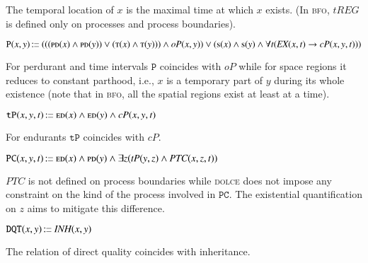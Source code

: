 \documentclass[ao]{iosart2x}
\newcommand{\nb}[1]{\textcolor{red}{$|$}\marginpar{\hspace*{-0cm}\parbox{20mm}{\scriptsize\raggedright\textcolor{red}{#1}}}}
\newcommand{\bfoAxLabel}{\textrm{a$_\texttt{b}$}}
\newcommand{\bdDefLabel}{\textrm{d$_\texttt{bd}$}}
\newcounter{cntbddf}
\newcommand{\bddf}[1]{\refstepcounter{cntbddf}\begin{small}{\bf \bdDefLabel\thecntbddf\label{#1}}\end{small}}
\newcommand{\refbfoax}[1]{({\bfoAxLabel}\ref{#1})}
\newcommand{\refbddf}[1]{({\bdDefLabel}\ref{#1})}
\newcommand{\pr}[1]{\mathtt{#1}}
\newcommand{\prbfo}[1]{{\textit{{#1}}}}
\newcommand\textequal{%
 \rule[.08ex]{5pt}{0.35pt}\llap{\rule[.78ex]{5pt}{0.35pt}}}
\newcommand{\sdef}{{\hspace{1.5pt}:\hspace{-2.5pt}\textequal\hspace{3pt}}}
\newcommand{\dolce}{{\textsc{dolce}}}
\newcommand{\bfo}{{\textsc{bfo}}}
\newcommand {\EDdcat} {\textsc{ed}}
\newcommand {\PDdcat} {\textsc{pd}}
\newcommand {\PRdcat} {\textsc{pr}}
\newcommand {\Sdcat} {\textsc{s}}
\newcommand {\Tdcat} {\textsc{t}}
\newcommand {\TPd} {\ensuremath{\pr{tP}}}
\newcommand {\Pd} {\ensuremath{\pr{P}}}
\newcommand {\DQTd} {\ensuremath{\pr{DQT}}}
\newcommand {\PCd} {\ensuremath{\pr{PC}}}
\newcommand{\bfoisa}{\prbfo{ISA}}
\newcommand{\bfocpart}{\prbfo{cP}}
\newcommand{\bfoopart}{\prbfo{oP}}
\newcommand{\bfotpart}{\prbfo{tP}}
\newcommand{\bfoexist}{\prbfo{EX}}
\newcommand{\bfoinh}{\prbfo{INH}}
\newcommand{\bfotregof}{\prbfo{tREG}}
\newcommand{\bfoparticin}{\prbfo{PTC}}
\begin{document}
\vspace{1pt}
The temporal location of $x$ is the maximal time at which $x$ exists. (In {\bfo}, $\bfotregof$ is defined only on processes and process boundaries). 


\item[\bddf{b2d_Pd}] $\Pd(x,y)\sdef (((\PDdcat(x) \land \PDdcat(y)) \lor (\Tdcat(x) \land \Tdcat(y))) \land \bfoopart(x,y)) \lor (\Sdcat(x) \land \Sdcat(y) \land \forall t(\bfoexist(x,t) \to \bfocpart(x,y,t)))$

\vspace{1pt}
For perdurant and time intervals $\Pd$ coincides with $\bfoopart$ while for space regions it reduces to constant parthood, i.e., $x$ is a temporary part of $y$ during its whole existence (note that in {\bfo}, all the spatial regions exist at least at a time). 

%
%

\item[\bddf{b2d_TPd}] $\TPd(x,y,t) \sdef \EDdcat(x) \land \EDdcat(y) \land \bfocpart(x,y,t)$

\vspace{1pt}
For endurants $\TPd$ coincides with $\bfocpart$. 

\item[\bddf{b2d_PCd}] $\PCd(x,y,t) \sdef \EDdcat(x) \land \PDdcat(y) \land \exists z(\bfotpart(y,z) \land \bfoparticin(x,z,t))$

\vspace{1pt}
$\bfoparticin$ is not defined on process boundaries while {\dolce} does not impose any constraint on the kind of the process involved in $\PCd$. The existential quantification on $z$ aims to mitigate this difference. 


\item[\bddf{b2d_DQTd}] $\DQTd(x,y) \sdef \bfoinh(x,y)$

\vspace{1pt}
The relation of direct quality coincides with inheritance. %
\end{document}
